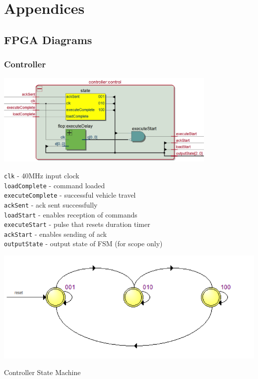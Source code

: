 \documentclass[12pt]{article}
\begin{document}
\section{Appendices}
\subsection{FPGA Diagrams}
\subsubsection{Controller}
\begin{center}
\includegraphics[width=0.8\textwidth]{controller}
\end{center}
\verb.clk. - 40MHz input clock 
\\ \verb.loadComplete. - command loaded
\\ \verb.executeComplete. - successful vehicle travel
\\ \verb.ackSent. - ack sent successfully
\\ \verb.loadStart. - enables reception of commands
\\ \verb.executeStart. - pulse that resets duration timer
\\ \verb.ackStart. - enables sending of ack
\\ \verb.outputState. - output state of FSM (for scope only)

\begin{center}
\includegraphics{states}

Controller State Machine
\end{center}
\end{document}
